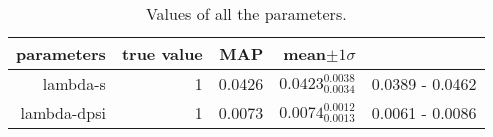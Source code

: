 \begin{table*}\caption{Values of all the parameters.}\begin{center}\begin{tabular}{ r r r r r} parameters & true value & MAP & mean$\pm 1 \sigma$ \\ 
\hline  lambda-s & 1 & 0.0426 & $0.0423_{0.0034}^{0.0038}$ & 0.0389 - 0.0462 \\ 
\hline lambda-dpsi & 1 & 0.0073 & $0.0074_{0.0013}^{0.0012}$ & 0.0061 - 0.0086 \\ 
\end{tabular}\end{center}\label{tab:1}\end{table*}